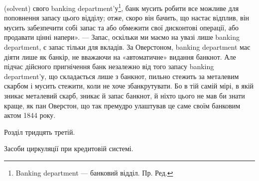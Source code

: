 (solvent) свого banking department’у\footnote*{
Banking department — банковий відділ. Пр. Ред.
}, банк мусить робити все можливе для поповнення запасу цього
відділу; отже, скоро він бачить, що настає відплив, він мусить забезпечити собі запас та або
обмежити свої дисконтові операції, або продавати цінні
напери». — Запас, оскільки ми маємо на увазі лише banking department, є запас
тільки для вкладів. За Оверстоном, banking department має діяти лише як банкір,
не вважаючи на «автоматичне» видання банкнот. Але підчас дійсного пригнічення
банк незалежно від того запасу banking department'у, що складається лише з
банкнот, пильно стежить за металевим скарбом і мусить стежити, коли не хоче
збанкрутувати. Бо в тій самій мірі, в якій зникає металевий скарб, зникає й
запас банкнот, й ніхто цього не мав би знати краще, як пан Оверстон, що так
премудро улаштував це саме своїм банковим актом 1844 року.

Розділ тридцять третій.

Засоби циркуляції при кредитовій системі.

